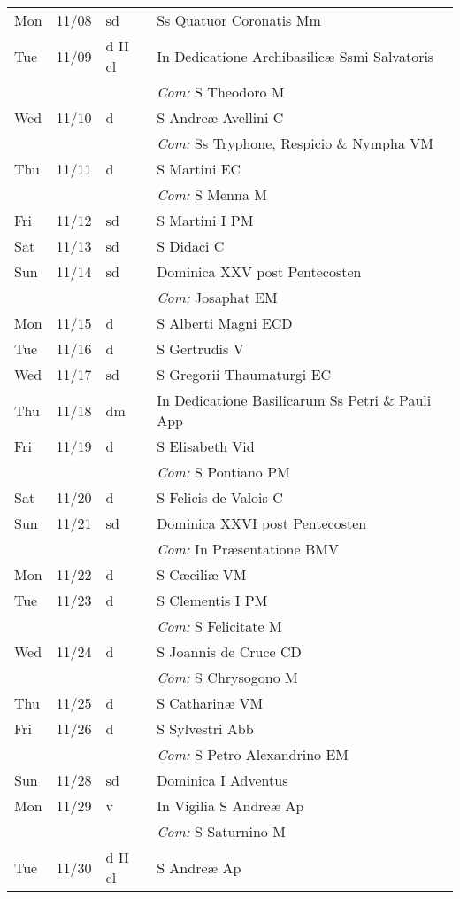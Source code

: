 \documentclass[10pt]{article}
\begin{document}
\begin{longtable}{ l l l l }
Mon & 11/08 & sd & Ss Quatuor Coronatis Mm\\
Tue & 11/09 & d II cl & In Dedicatione Archibasilicæ Ssmi Salvatoris\\
 & & & \textit{Com:} S Theodoro M\\
Wed & 11/10 & d & S Andreæ Avellini C\\
 & & & \textit{Com:} Ss Tryphone, Respicio \& Nympha VM\\
Thu & 11/11 & d & S Martini  EC\\
 & & & \textit{Com:} S Menna M\\
Fri & 11/12 & sd & S Martini I PM\\
Sat & 11/13 & sd & S Didaci C\\
Sun & 11/14 & sd & Dominica XXV post Pentecosten\\
 & & & \textit{Com:} Josaphat EM\\
Mon & 11/15 & d & S Alberti Magni ECD\\
Tue & 11/16 & d & S Gertrudis V\\
Wed & 11/17 & sd & S Gregorii Thaumaturgi EC\\
Thu & 11/18 & dm & In Dedicatione Basilicarum Ss Petri \& Pauli App\\
Fri & 11/19 & d & S Elisabeth Vid\\
 & & & \textit{Com:} S Pontiano PM\\
Sat & 11/20 & d & S Felicis de Valois C\\
Sun & 11/21 & sd & Dominica XXVI post Pentecosten\\
 & & & \textit{Com:} In Præsentatione BMV\\
Mon & 11/22 & d & S Cæciliæ VM\\
Tue & 11/23 & d & S Clementis I PM\\
 & & & \textit{Com:} S Felicitate M\\
Wed & 11/24 & d & S Joannis de Cruce CD\\
 & & & \textit{Com:} S Chrysogono M\\
Thu & 11/25 & d & S Catharinæ VM\\
Fri & 11/26 & d & S Sylvestri Abb\\
 & & & \textit{Com:} S Petro Alexandrino EM\\
Sun & 11/28 & sd & Dominica I Adventus\\
Mon & 11/29 & v & In Vigilia S Andreæ Ap\\
 & & & \textit{Com:} S Saturnino M\\
Tue & 11/30 & d II cl & S Andreæ Ap\\

\end{longtable}
\end{document}

